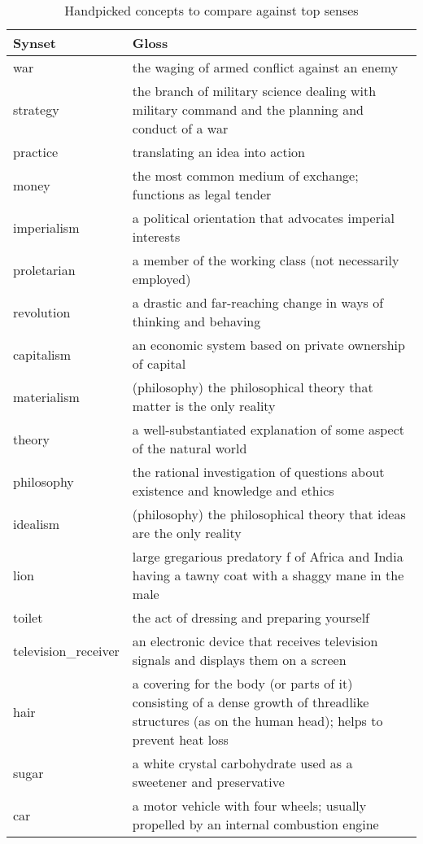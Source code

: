 
\begin{table*}[t]
\caption*{Handpicked concepts to compare against top senses}
\centering
\begin{tabular}{ p{2.5cm} p{15cm} }
    \toprule
    Synset & Gloss \\
    \midrule
            war & the waging of armed conflict against an enemy \\
            strategy & the branch of military science dealing with military command and the planning and conduct of a war \\
            practice & translating an idea into action \\
            money & the most common medium of exchange; functions as legal tender \\
            imperialism & a political orientation that advocates imperial interests \\
            proletarian & a member of the working class (not necessarily employed) \\
            revolution & a drastic and far-reaching change in ways of thinking and behaving \\
            capitalism & an economic system based on private ownership of capital\\
            materialism & (philosophy) the philosophical theory that matter is the only reality \\
            theory & a well-substantiated explanation of some aspect of the natural world \\
            philosophy & the rational investigation of questions about existence and knowledge and ethics \\
            idealism & (philosophy) the philosophical theory that ideas are the only reality \\
            lion & large gregarious predatory f of Africa and India having a tawny coat with a shaggy mane in the male \\
            toilet & the act of dressing and preparing yourself \\
            television\_receiver & an electronic device that receives television signals and displays them on a screen \\
            hair & a covering for the body (or parts of it) consisting of a dense growth of threadlike structures (as on the human head); helps to prevent heat loss \\
            sugar & a white crystal carbohydrate used as a sweetener and preservative \\
            car & a motor vehicle with four wheels; usually propelled by an internal combustion engine \\

    \bottomrule
\end{tabular}

\end{table*}

